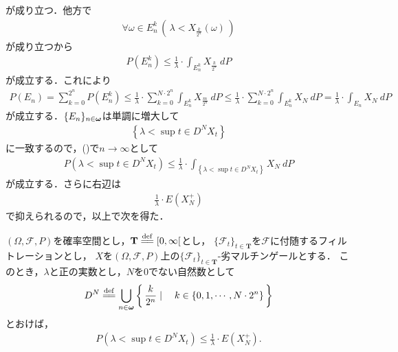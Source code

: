 	が成り立つ．他方で
	\begin{align}
		\forall \omega \in E_n^k\, \left(\, \lambda < X_{\frac{k}{2^n}}(\omega)\, \right)
	\end{align}
	が成り立つから
	\begin{align}
		P(E_n^k) \leq \frac{1}{\lambda} \cdot \int_{E_n^k} X_{\frac{k}{2^n}}\ dP
	\end{align}
	が成立する．これにより
	\begin{align}
		P(E_n) = \sum_{k=0}^{2^n} P(E_n^k)
		\leq \frac{1}{\lambda} \cdot \sum_{k=0}^{N \cdot 2^n} \int_{E_n^k} X_{\frac{m}{2^n}}\ dP
		\leq \frac{1}{\lambda} \cdot \sum_{k=0}^{N \cdot 2^n} \int_{E_n^k} X_N\ dP
		= \frac{1}{\lambda} \cdot \int_{E_n} X_N\ dP
		\label{fom:Doob_upper_bound_inequality_1}
	\end{align}
	が成立する．$\{E_n\}_{n \in {\boldsymbol \omega}}$は単調に増大して
	\begin{align}
		\left\{\lambda < \sup{t \in D^N}{X_t}\right\}
	\end{align}
	に一致するので，()で$n \longrightarrow \infty$として
	\begin{align}
		P\left(\lambda < \sup{t \in D^N}{X_t}\right)
		\leq \frac{1}{\lambda} \cdot \int_{\left\{\lambda < \sup{t \in D^N}{X_t}\right\}} X_N\ dP
	\end{align}
	が成立する．さらに右辺は
	\begin{align}
		\frac{1}{\lambda} \cdot E\left(X_N^+\right)
	\end{align}
	で抑えられるので，以上で次を得た．
	
	\begin{screen}
		\begin{thm}[Doobの上限不等式]\label{thm:Doob_sup_bounded_inequality}
			$(\Omega,\mathscr{F},P)$を確率空間とし，$\mathbf{T} \defeq [0,\infty[$とし，
			$\{\mathscr{F}_t\}_{t \in \mathbf{T}}$を$\mathscr{F}$に付随するフィルトレーションとし，
			$X$を$(\Omega,\mathscr{F},P)$上の$\{\mathscr{F}_t\}_{t \in \mathbf{T}}$-劣マルチンゲールとする．
			このとき，$\lambda$と正の実数とし，$N$を$0$でない自然数として
			\begin{align}
				D^N \defeq \bigcup_{n \in \Natural} \Set{\frac{k}{2^n}}{k \in \{0,1,\cdots,N \cdot 2^n\}}
			\end{align}
			とおけば，
			\begin{align}
				P\left(\lambda < \sup{t \in D^N}{X_t}\right)
				\leq \frac{1}{\lambda} \cdot E\left(X_N^+\right).
			\end{align}
		\end{thm}
	\end{screen}
	
